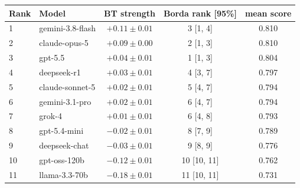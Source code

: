 \begin{tabular}{llccc}
\toprule
Rank & Model & BT strength & Borda rank [95\%] & mean score \\
\midrule
1 & gemini-3.8-flash & $+0.11 \pm 0.01$ & 3 [1, 4] & 0.810 \\
2 & claude-opus-5 & $+0.09 \pm 0.00$ & 2 [1, 3] & 0.810 \\
3 & gpt-5.5 & $+0.04 \pm 0.01$ & 1 [1, 3] & 0.804 \\
4 & deepseek-r1 & $+0.03 \pm 0.01$ & 4 [3, 7] & 0.797 \\
5 & claude-sonnet-5 & $+0.02 \pm 0.01$ & 5 [4, 7] & 0.794 \\
6 & gemini-3.1-pro & $+0.02 \pm 0.01$ & 6 [4, 7] & 0.794 \\
7 & grok-4 & $+0.01 \pm 0.01$ & 6 [4, 8] & 0.793 \\
8 & gpt-5.4-mini & $-0.02 \pm 0.01$ & 8 [7, 9] & 0.789 \\
9 & deepseek-chat & $-0.03 \pm 0.01$ & 9 [8, 9] & 0.776 \\
10 & gpt-oss-120b & $-0.12 \pm 0.01$ & 10 [10, 11] & 0.762 \\
11 & llama-3.3-70b & $-0.18 \pm 0.01$ & 11 [10, 11] & 0.731 \\
\bottomrule
\end{tabular}
